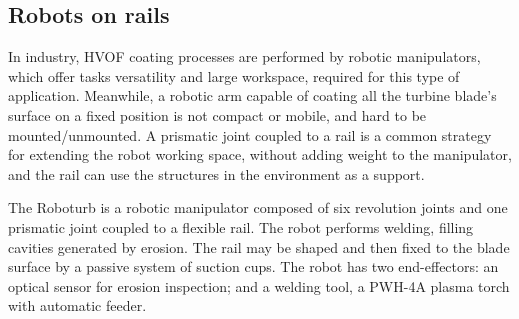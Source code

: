 \subsection{Robots on rails}\label{sec::rail}
In industry, HVOF coating processes are performed by robotic manipulators,
which offer tasks versatility and large workspace, required for this
type of application. Meanwhile, a robotic arm capable of coating all the turbine
blade's surface on a fixed position is not compact or mobile, and hard to be
mounted/unmounted. A prismatic joint coupled to a rail is a common strategy for
extending the robot working space, without adding weight to the manipulator,
and the rail can use the structures in the environment as a support.





The Roboturb \citep{roboturb} is a robotic manipulator composed of six
revolution joints and one prismatic joint coupled to a flexible rail.
The robot performs welding, filling cavities generated by erosion. The rail
may be shaped and then fixed to the blade surface by a passive system of
suction cups. The robot has two end-effectors: an optical sensor for erosion
inspection; and a welding tool, a PWH-4A plasma torch with automatic feeder.


